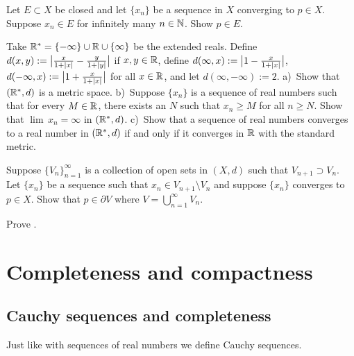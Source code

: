 \begin{exercise}
Let $E \subset X$ be closed and
let $\{ x_n \}$ be a sequence in $X$ converging to $p \in X$.  Suppose
$x_n \in E$ for infinitely many $n \in {\mathbb{N}}$.  Show $p \in E$.
\end{exercise}

\begin{exercise}
Take ${\mathbb{R}}^* = \{ -\infty \} \cup {\mathbb{R}} \cup \{ \infty \}$ be the extended reals.
Define $d(x,y) := \bigl\lvert \frac{x}{1+\left\lvert {x} \right\rvert} - \frac{y}{1+\left\lvert {y} \right\rvert}
\bigr\rvert$
if $x, y \in {\mathbb{R}}$,
define $d(\infty,x) := \bigl\lvert 1 - \frac{x}{1+\left\lvert {x} \right\rvert} \bigr\rvert$,
$d(-\infty,x) := \bigl\lvert 1 + \frac{x}{1+\left\lvert {x} \right\rvert} \bigr\rvert$
for all $x \in {\mathbb{R}}$, and
let $d(\infty,-\infty) := 2$.
a)~Show that $({\mathbb{R}}^*,d)$ is a metric space.
b)~Suppose $\{ x_n \}$ is a sequence of real numbers such that
for every $M \in {\mathbb{R}}$, there exists an $N$ such that
$x_n \geq M$ for all $n \geq N$.  Show that $\lim\, x_n = \infty$ in
$({\mathbb{R}}^*,d)$.
c)~Show that a sequence of real numbers converges to a real number
in $({\mathbb{R}}^*,d)$ if and
only if it converges in ${\mathbb{R}}$ with the standard metric.
\end{exercise}

\begin{exercise}
Suppose $\{ V_n \}_{n=1}^\infty$ is a collection of open sets
in $(X,d)$
such that $V_{n+1} \supset V_n$.  Let $\{ x_n \}$ be a sequence
such that $x_n \in V_{n+1} \setminus V_n$ and suppose 
$\{ x_n \}$ converges to $p \in X$.  Show that $p \in \partial V$
where $V = \bigcup_{n=1}^\infty V_n$.
\end{exercise}

\begin{exercise}
Prove .
\end{exercise}


\sectionnewpage
\section{Completeness and compactness}
\label{sec:metcompact}


\subsection{Cauchy sequences and completeness}

Just like with sequences of real numbers we define Cauchy sequences.

